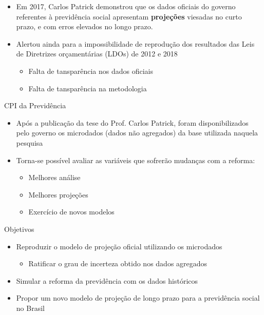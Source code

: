 \begin{frame}
  \begin{block}{}
    \begin{itemize}
      \item Em 2017, Carlos Patrick \cite{patrick} demonstrou que os dados
      oficiais do governo referentes à previdência social apresentam
      \textbf{projeções} \alert{viesadas no curto prazo}, e com \alert{erros
elevados no longo prazo}.
      \item Alertou ainda para a \alert{impossibilidade de reprodução dos
resultados} das Leis de Diretrizes orçamentárias (LDOs) de 2012 e 2018
      \begin{itemize}
        \item Falta de tansparência nos dados oficiais
        \item Falta de tansparência na metodologia
      \end{itemize}
    \end{itemize}
  \end{block}
\end{frame}

\begin{frame}
  \begin{block}{CPI da Previdência}
    \begin{itemize}
      \item Após a publicação da tese do Prof. Carlos Patrick, foram
      disponibilizados pelo governo os microdados (dados não agregados) da base
      utilizada naquela pesquisa
      \item Torna-se possível avaliar as variáveis que sofrerão mudanças com a
      reforma:
      \begin{itemize}
        \item  Melhores análise
        \item  Melhores projeções
        \item  Exercício de novos modelos
      \end{itemize}
    \end{itemize}
  \end{block}
\end{frame}

\begin{frame}
  \begin{block}{Objetivos}
    \begin{itemize}
      \item Reproduzir o modelo de projeção oficial utilizando os microdados
      \begin{itemize}
        \item Ratificar o grau de incerteza obtido nos dados agregados
      \end{itemize}
      \item Simular a reforma da previdência com os dados históricos
      \item Propor um novo modelo de projeção de longo prazo para a previdência
      social no Brasil
    \end{itemize}
  \end{block}
\end{frame}

